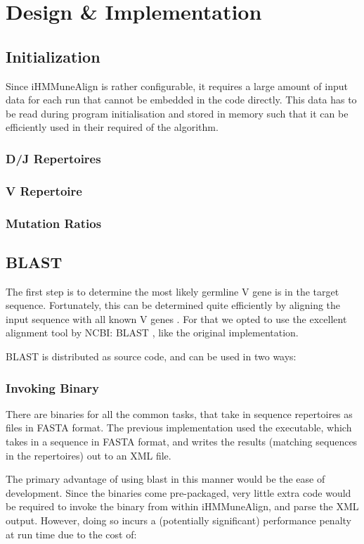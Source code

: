 \chapter{Design \& Implementation}

\section{Initialization}
Since iHMMuneAlign is rather configurable, it requires a large amount of input data for each run that cannot be embedded in the code directly. This data has to be read during program initialisation and stored in memory such that it can be efficiently used in their required of the algorithm.
\subsection{D/J Repertoires}
\subsection{V Repertoire}
\subsection{Mutation Ratios}

\section{BLAST}
The first step is to determine the most likely germline V gene is in the target sequence. Fortunately, this can be determined quite efficiently by aligning the input sequence with all known V genes \cite{iHMMuneAlign}. For that we opted to use the excellent alignment tool by NCBI: BLAST \cite{blast}, like the original implementation.

BLAST is distributed as source code, and can be used in two ways:
\subsection{Invoking Binary}
\label{sec:blast-bin}
There are binaries for all the common tasks, that take in sequence repertoires as files in FASTA \autocite{fasta} format. The previous implementation used the  executable, which takes in a sequence in FASTA format, and writes the results (matching sequences in the repertoires) out to an XML file.

The primary advantage of using blast in this manner would be the ease of development. Since the binaries come pre-packaged, very little extra code would be required to invoke the binary from within iHMMuneAlign, and parse the XML output. However, doing so incurs a (potentially significant) performance penalty at run time due to the cost of:

